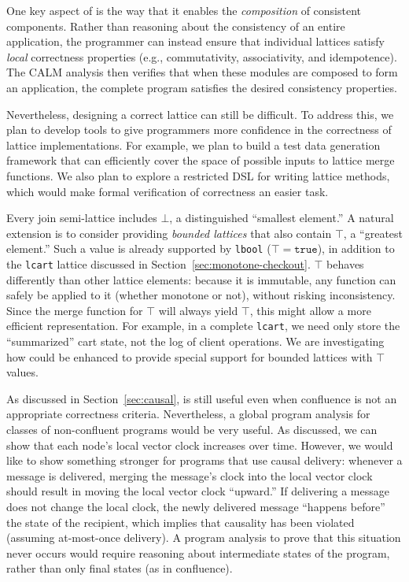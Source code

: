 One key aspect of \lang is the way that it enables the \emph{composition} of consistent components. Rather than reasoning about the consistency of an
entire application, the programmer can instead ensure that individual lattices
satisfy \emph{local} correctness properties (e.g., commutativity, associativity,
and idempotence). The CALM analysis then verifies that when these modules are
composed to form an application, the complete program satisfies the desired
consistency properties.

Nevertheless, designing a correct lattice can still be difficult. To address
this, we plan to develop tools to give programmers more confidence in the
correctness of lattice implementations. For example, we plan to build a test
data generation framework that can efficiently cover the space of possible
inputs to lattice merge functions. We also plan to explore a restricted DSL for
writing lattice methods, which would make formal verification of correctness an
easier task.

Every join semi-lattice includes $\bot$, a distinguished ``smallest element.'' A natural
extension is to consider providing \emph{bounded lattices} that also contain   $\top$, a ``greatest
element.'' Such a value is already supported by \texttt{lbool} ($\top =
\mathtt{true}$), in addition to the \texttt{lcart} lattice discussed in
Section~\ref{sec:monotone-checkout}. $\top$ behaves differently than other
lattice elements: because it is immutable, any function can safely be applied to
it (whether monotone or not), without risking inconsistency. Since the merge
function for $\top$ will always yield $\top$, this might allow a more efficient
representation.  For example, in a complete \texttt{lcart}, we need only store the
``summarized'' cart state, not the log of client operations. We are
investigating how \lang could be enhanced to provide special support for
bounded lattices with $\top$ values.

As discussed in Section~\ref{sec:causal}, \lang is still useful even when
confluence is not an appropriate correctness criteria. Nevertheless, a global
program analysis for classes of non-confluent programs would be very useful. As discussed, we can show that each node's local vector clock increases over
time. However, we would like to show something stronger for programs that use
causal delivery: whenever a message is delivered, merging the message's clock
into the local vector clock should result in moving the local vector clock
``upward.'' If delivering a message does not change the local clock, the newly
delivered message ``happens before'' the state of the recipient, which implies
that causality has been violated (assuming at-most-once delivery). A program
analysis to prove that this situation never occurs would require reasoning about
intermediate states of the program, rather than only final states (as in
confluence).

